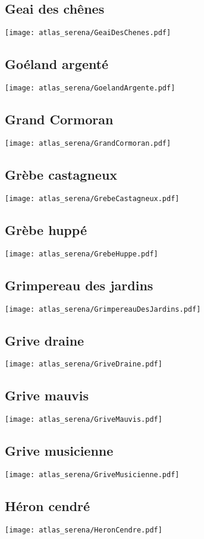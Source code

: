 \subsection{Geai des chênes}
\texttt{[image: atlas\_serena/GeaiDesChenes.pdf]}
\subsection{Goéland argenté}
\texttt{[image: atlas\_serena/GoelandArgente.pdf]}
\subsection{Grand Cormoran}
\texttt{[image: atlas\_serena/GrandCormoran.pdf]}
\subsection{Grèbe castagneux}
\texttt{[image: atlas\_serena/GrebeCastagneux.pdf]}
\subsection{Grèbe huppé}
\texttt{[image: atlas\_serena/GrebeHuppe.pdf]}
\subsection{Grimpereau des jardins}
\texttt{[image: atlas\_serena/GrimpereauDesJardins.pdf]}
\subsection{Grive draine}
\texttt{[image: atlas\_serena/GriveDraine.pdf]}
\subsection{Grive mauvis}
\texttt{[image: atlas\_serena/GriveMauvis.pdf]}
\subsection{Grive musicienne}
\texttt{[image: atlas\_serena/GriveMusicienne.pdf]}
\subsection{Héron cendré}
\texttt{[image: atlas\_serena/HeronCendre.pdf]}
